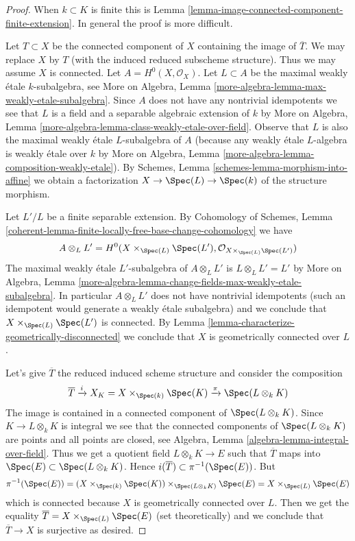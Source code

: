 \begin{proof}
When $k \subset K$ is finite this is
Lemma \ref{lemma-image-connected-component-finite-extension}.
In general the proof is more difficult.

\medskip\noindent
Let $T \subset X$ be the connected component of $X$ containing
the image of $\overline{T}$. We may replace $X$ by $T$
(with the induced reduced subscheme structure). Thus we
may assume $X$ is connected. Let $A = H^0(X, \mathcal{O}_X)$.
Let $L \subset A$ be the maximal weakly \'etale $k$-subalgebra, see
More on Algebra, Lemma \ref{more-algebra-lemma-max-weakly-etale-subalgebra}.
Since $A$ does not have any nontrivial idempotents we see
that $L$ is a field and a separable algebraic extension of $k$ by
More on Algebra, Lemma \ref{more-algebra-lemma-class-weakly-etale-over-field}.
Observe that $L$ is also the maximal weakly \'etale $L$-subalgebra of $A$
(because any weakly \'etale $L$-algebra is weakly \'etale over $k$
by More on Algebra, Lemma \ref{more-algebra-lemma-composition-weakly-etale}).
By Schemes, Lemma \ref{schemes-lemma-morphism-into-affine}
we obtain a factorization $X \to \Spec(L) \to \Spec(k)$
of the structure morphism.

\medskip\noindent
Let $L'/L$ be a finite separable extension. By
Cohomology of Schemes, Lemma
\ref{coherent-lemma-finite-locally-free-base-change-cohomology}
we have
$$
A \otimes_L L' =
H^0(X \times_{\Spec(L)} \Spec(L'), \mathcal{O}_{X \times_{\Spec(L)} \Spec(L')})
$$
The maximal weakly \'etale $L'$-subalgebra of $A \otimes_L L'$
is $L \otimes_L L' = L'$ by More on Algebra, Lemma
\ref{more-algebra-lemma-change-fields-max-weakly-etale-subalgebra}.
In particular $A \otimes_L L'$ does not have nontrivial idempotents
(such an idempotent would generate a weakly \'etale subalgebra)
and we conclude that $X \times_{\Spec(L)} \Spec(L')$ is connected.
By Lemma \ref{lemma-characterize-geometrically-disconnected}
we conclude that $X$ is geometrically connected over $L$.

\medskip\noindent
Let's give $\overline{T}$ the reduced induced scheme structure
and consider the composition
$$
\overline{T} \xrightarrow{i} X_K = X \times_{\Spec(k)} \Spec(K)
\xrightarrow{\pi}
\Spec(L \otimes_k K)
$$
The image is contained in a connected component of $\Spec(L \otimes_k K)$.
Since $K \to L \otimes_k K$ is integral we see that
the connected components of $\Spec(L \otimes_k K)$
are points and all points are closed, see
Algebra, Lemma \ref{algebra-lemma-integral-over-field}.
Thus we get a quotient field $L \otimes_k K \to E$
such that $\overline{T}$ maps into $\Spec(E) \subset \Spec(L \otimes_k K)$.
Hence $i(\overline{T}) \subset \pi^{-1}(\Spec(E))$. But
$$
\pi^{-1}(\Spec(E)) =
(X \times_{\Spec(k)} \Spec(K)) \times_{\Spec(L \otimes_k K)} \Spec(E) =
X \times_{\Spec(L)} \Spec(E)
$$
which is connected because $X$ is geometrically connected over $L$.
Then we get the equality
$\overline{T} = X \times_{\Spec(L)} \Spec(E)$ (set theoretically)
and we conclude that $\overline{T} \to X$ is surjective as desired.
\end{proof}

